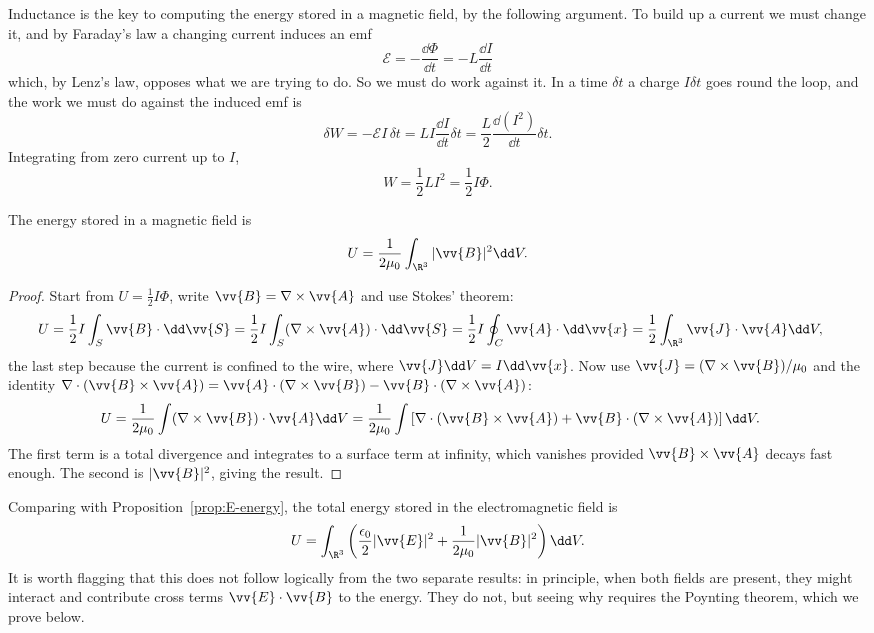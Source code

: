 Inductance is the key to computing the energy stored in a magnetic field, by the following argument. To build up a current we must change it, and by Faraday's law a changing current induces an emf
$$
\mathcal{E} = -\frac{\dd \Phi}{\dd t} = -L\frac{\dd I}{\dd t}
$$
which, by Lenz's law, opposes what we are trying to do. So we must do work against it. In a time $\delta t$ a charge $I\delta t$ goes round the loop, and the work we must do against the induced emf is
$$
\delta W = -\mathcal{E} I\, \delta t = LI \frac{\dd I}{\dd t}\delta t = \frac{L}{2}\frac{\dd (I^2)}{\dd t}\delta t.
$$
Integrating from zero current up to $I$,
$$
W = \frac{1}{2}LI^2 = \frac{1}{2}I\Phi.
$$

\begin{proposition}
	\label{prop:B-energy}
	The energy stored in a magnetic field is
	$$
	U = \frac{1}{2\mu_0}\int_{\R^3}|\vv{B}|^2 \dd V.
	$$
\end{proposition}
\begin{proof}
	Start from $U = \tfrac12 I \Phi$, write $\vv{B} = \nabla\times\vv{A}$ and use Stokes' theorem:
	\begin{align*}
		U &= \frac{1}{2}I\int_S \vv{B}\cdot \dd \vv{S} = \frac{1}{2}I\int_S (\nabla\times \vv{A})\cdot \dd \vv{S} = \frac{1}{2}I\oint_C \vv{A}\cdot\dd\vv{x} = \frac{1}{2}\int_{\R^3}\vv{J}\cdot \vv{A}\dd V,
	\end{align*}
	the last step because the current is confined to the wire, where $\vv{J}\dd V = I \dd \vv{x}$. Now use $\vv{J} = (\nabla\times\vv{B})/\mu_0$ and the identity $\nabla\cdot(\vv{B}\times\vv{A}) = \vv{A}\cdot(\nabla\times\vv{B}) - \vv{B}\cdot(\nabla\times\vv{A})$:
	\begin{align*}
		U &= \frac{1}{2\mu_0}\int (\nabla\times \vv{B})\cdot \vv{A}\dd V = \frac{1}{2\mu_0}\int\left[\nabla\cdot(\vv{B}\times\vv{A}) + \vv{B}\cdot(\nabla\times\vv{A})\right]\dd V.
	\end{align*}
	The first term is a total divergence and integrates to a surface term at infinity, which vanishes provided $\vv{B}\times\vv{A}$ decays fast enough. The second is $|\vv{B}|^2$, giving the result.
\end{proof}

Comparing with Proposition~\ref{prop:E-energy}, the total energy stored in the electromagnetic field is
$$
U = \int_{\R^3}\left(\frac{\epsilon_0}{2}|\vv{E}|^2 + \frac{1}{2\mu_0}|\vv{B}|^2\right)\dd V.
$$
It is worth flagging that this does not follow logically from the two separate results: in principle, when both fields are present, they might interact and contribute cross terms $\vv{E}\cdot\vv{B}$ to the energy. They do not, but seeing why requires the Poynting theorem, which we prove below.

